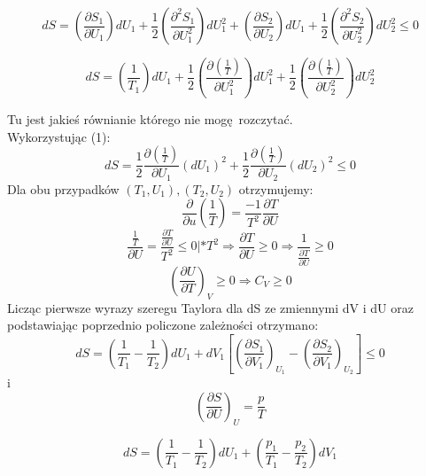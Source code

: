 \documentclass{article}
\begin{document}
		\begin{equation}
			dS = 
			(\frac{\partial S_1}{\partial U_1})dU_1 + 
			\frac{1}{2}(\frac{\partial^2S_1}{\partial U_1^2})dU_1^2 + 
			(\frac{\partial S_2}{\partial U_2})dU_1 +
			\frac{1}{2}(\frac{\partial^2S_2}{\partial U_2^2})dU_2^2 \leqslant 0
		\end{equation}
		
		\begin{equation}
			dS = 
			(\frac {1} {T_1})dU_1 + 
			\frac{1}{2}(\frac{\partial (\frac{1}{T})}{\partial U_1^2})dU_1^2 + 
			\frac{1}{2}(\frac{\partial (\frac{1}{T})}{\partial U_2^2})dU_2^2
		\end{equation}
		
		Tu jest jakieś równianie którego nie mogę rozczytać.\\
		Wykorzystując (1):
		\begin{equation}
			dS = 
			\frac{1}{2} \frac{\partial (\frac{1}{T})}{\partial U_1}(dU_1)^2 + 
			\frac{1}{2} \frac{\partial (\frac{1}{T})}{\partial U_2}(dU_2)^2 
			\leqslant 0
		\end{equation}
		Dla obu przypadków $ (T_1, U_1), (T_2, U_2) $ otrzymujemy:
		\begin{equation}
			\frac{\partial }{\partial u}(\frac{1}{T}) = \frac{-1}{T^2}\frac{\partial T}{\partial U}
		\end{equation}
		\begin{equation}
			\frac{\frac{1}{T}}{\partial U} = 
			\frac{\frac{\partial T}{\partial U}}{T^2} \leqslant 0 | * T^2
			\Rightarrow \frac{\partial T}{\partial U} \geqslant 0
			\Rightarrow \frac{1}{\frac{\partial T}{\partial U}}  \geqslant 0	
		\end{equation}
		\begin{equation}
			(\frac{\partial U}{\partial T})_V \geqslant 0
			\Rightarrow C_V \geqslant 0
		\end{equation}
		Licząc pierwsze wyrazy szeregu Taylora dla dS ze zmiennymi dV i dU oraz podstawiając poprzednio policzone zależności otrzymano:
		\begin{equation}
			dS = (\frac{1}{T_1} - \frac{1}{T_2})dU_1 + dV_1 [(\frac{\partial S_1}{\partial V_1})_{U_1} - (\frac{\partial S_2}{\partial V_1})_{U_2}] \leqslant 0
		\end{equation}
		i
		\begin{equation}
		(\frac{\partial S}{\partial U})_U = \frac{p}{T}
		\end{equation}
		
		\begin{equation}
		dS = (\frac{1}{T_1} - \frac{1}{T_2})dU_1 + (\frac{p_1}{T_1} - \frac{p_2}{T_2})dV_1
		\end{equation}
	
\end{document}
